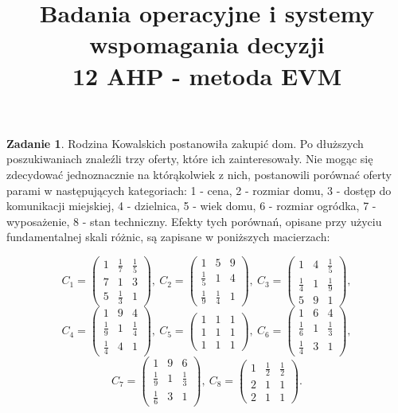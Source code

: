 \documentclass{article}[UTF8]
\theoremstyle{definition}
\newtheorem{zad}{Zadanie}
\begin{document}
\title{Badania operacyjne i systemy wspomagania decyzji
\\ \Large 12 AHP - metoda EVM}
\date{}

\maketitle


\begin{zad}

Rodzina Kowalskich postanowiła zakupić dom. Po dłuższych poszukiwaniach znaleźli trzy oferty, które ich zainteresowały. Nie mogąc się zdecydować jednoznacznie na którąkolwiek z nich, postanowili porównać oferty parami w następujących kategoriach:
1 - cena,
2 - rozmiar domu,
3 - dostęp do komunikacji miejskiej,
4 - dzielnica,
5 - wiek domu,
6 - rozmiar ogródka,
7 - wyposażenie,
8 - stan techniczny.
Efekty tych porównań, opisane przy użyciu fundamentalnej skali różnic, są zapisane w poniższych macierzach:


$$C_1=\begin{pmatrix}
1 & \frac{1}{7} & \frac{1}{5} \\
7&1&3 \\
5&\frac{1}{3}&1
\end{pmatrix}, \
C_2=\begin{pmatrix}
1&5&9\\
\frac{1}{5}&1&4\\
\frac{1}{9}&\frac{1}{4}&1
\end{pmatrix}, \
C_3=\begin{pmatrix}
1&4&\frac{1}{5}\\
\frac{1}{4}&1&\frac{1}{9}\\
5&9&1
\end{pmatrix},
$$
$$
C_4=\begin{pmatrix}
1&9&4\\
\frac{1}{9}&1&\frac{1}{4}\\
\frac{1}{4}&4&1
\end{pmatrix}, \
C_5=\begin{pmatrix}
1&1&1\\
1&1&1\\
1&1&1
\end{pmatrix}, \
C_6=\begin{pmatrix}
1&6&4\\
\frac{1}{6}&1&\frac{1}{3}\\
\frac{1}{4}&3&1
\end{pmatrix},
$$
$$C_7=\begin{pmatrix}
1&9&6\\
\frac{1}{9}&1&\frac{1}{3}\\
\frac{1}{6}&3&1
\end{pmatrix}, \
C_8=\begin{pmatrix}
1&\frac{1}{2}&\frac{1}{2}\\
2&1&1\\
2&1&1
\end{pmatrix}.
$$


\end{zad}
\end{document}
